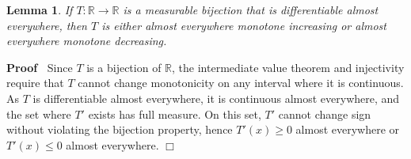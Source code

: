 \documentclass{article}
\newenvironment{proof}{\noindent\textbf{Proof\ }}{\hspace*{\fill}$\Box$\medskip}
\newtheorem{lemma}{Lemma}
\begin{document}
\begin{lemma}
  \label{lem:monotone}If $T : \mathbb{R} \to \mathbb{R}$ is a measurable
  bijection that is differentiable almost everywhere, then $T$ is either
  almost everywhere monotone increasing or almost everywhere monotone
  decreasing.
\end{lemma}

\begin{proof}
  Since $T$ is a bijection of $\mathbb{R}$, the intermediate value theorem and
  injectivity require that $T$ cannot change monotonicity on any interval
  where it is continuous. As $T$ is differentiable almost everywhere, it is
  continuous almost everywhere, and the set where $T'$ exists has full
  measure. On this set, $T'$ cannot change sign without violating the
  bijection property, hence $T' (x) \geq 0$ almost everywhere or $T' (x) \leq
  0$ almost everywhere.
\end{proof}
\end{document}
